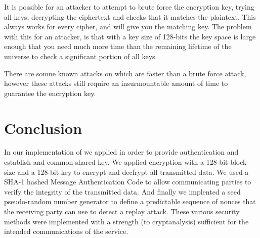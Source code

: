 \documentclass[a4paper,11pt]{article}
\begin{document}
It is possible for an attacker to attempt to brute force the encryption key, 
trying all keys, decrypting the ciphertext and checks that it matches the 
plaintext. This always works for every cipher, and will give you the matching 
key. The problem with this for an attacker, is that with a key size of 128-bits 
the key space is large enough that you need much more time than the remaining 
lifetime of the universe to check a significant portion of all keys.

There are somne known attacks on  which are faster than a brute
force attack, however these attacks still require an insurmountable amount of 
time to guarantee the encryption key.

\section{Conclusion}
In our implementation of \packageName{} we applied  in order to provide authentication and establish and common shared 
key. We applied  encryption with a 128-bit block size and a
128-bit key to encrypt and decfrypt all transmitted data. We used a SHA-1 
hashed Message Authentication Code to allow communicating parties to verify the
integrity of the transmitted data. And finally we implented a seed pseudo-random
number generator to define a predictable sequence of nonces that the receiving 
party can use to detect a replay attack. These various security methods were 
implemented with a strength (to cryptanalysis) sufficient for the intended 
communications of the \serviceName{} service.
\end{document}
